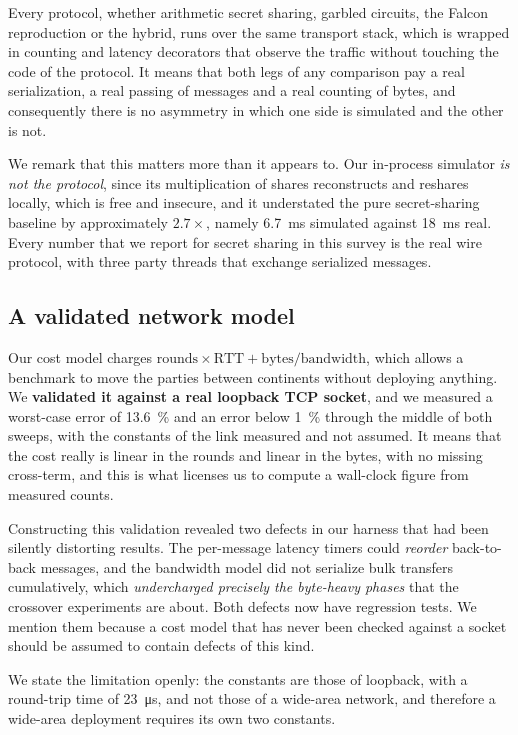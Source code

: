 \documentclass[11pt]{article}
\begin{document}
Every protocol, whether arithmetic secret sharing, garbled circuits, the Falcon
reproduction or the hybrid, runs over the same transport stack, which is wrapped in counting and
latency decorators that observe the traffic without touching the code of the protocol. It means
that both legs of any comparison pay a real serialization, a real passing of messages and a real
counting of bytes, and consequently there is no asymmetry in which one side is simulated and the
other is not.

We remark that this matters more than it appears to. Our in-process simulator \emph{is not the
protocol}, since its multiplication of shares reconstructs and reshares locally, which is free and
insecure, and it understated the pure secret-sharing baseline by approximately $2.7\times$,
namely \SI{6.7}{\milli\second} simulated against \SI{18}{\milli\second} real. Every number that we
report for secret sharing in this survey is the real wire protocol, with three party threads that
exchange serialized messages.

\subsection{A validated network model}
\label{sec:method:net}
\label{sec:netmodel}

Our cost model charges $\text{rounds} \times \text{RTT} + \text{bytes}/\text{bandwidth}$,
which allows a benchmark to move the parties between continents without deploying anything. We
\textbf{validated it against a real loopback TCP socket}, and we measured a worst-case error of
\SI{13.6}{\percent} and an error below \SI{1}{\percent} through the middle of both sweeps, with the
constants of the link measured and not assumed. It means that the cost really is linear in the
rounds and linear in the bytes, with no missing cross-term, and this is what licenses us to compute
a wall-clock figure from measured counts.

Constructing this validation revealed two defects in our harness that had been silently
distorting results. The per-message latency timers could \emph{reorder} back-to-back messages, and
the bandwidth model did not serialize bulk transfers cumulatively, which \emph{undercharged
precisely the byte-heavy phases} that the crossover experiments are about. Both defects now have
regression tests. We mention them because a cost model that has never been checked against a socket
should be assumed to contain defects of this kind.

We state the limitation openly: the constants are those of loopback, with a round-trip time of
\SI{23}{\micro\second}, and not those of a wide-area network, and therefore a wide-area deployment
requires its own two constants.
\end{document}
